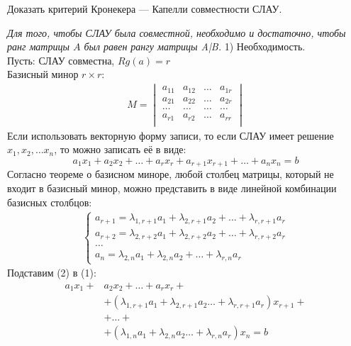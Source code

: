 \begin{question}
  Доказать критерий Кронекера — Капелли совместности СЛАУ.
\end{question} 
\begin{answer}
  \textit{Для того, чтобы СЛАУ была совместной, необходимо и достаточно, чтобы ранг матрицы $A$ был равен рангу матрицы A|B.}
  1) Необходимость. \\
  Пусть: СЛАУ совместна, $Rg(a) = r$\\
  Базисный минор  $r \times r$:
  \begin{gather*}
    M =
    \begin{vmatrix} 
      a_{11} & a_{12} & \ldots & a_{1r} \\ 
      a_{21} & a_{22} & \ldots & a_{2r} \\ 
      \ldots & \ldots & \ldots & \ldots \\
      a_{r1} & a_{r2} & \ldots & a_{rr} \\ 
    \end{vmatrix} 
  \end{gather*}
  Если использовать векторную форму записи, то если СЛАУ имеет решение $x_1, x_2, \ldots x_{n}$, то можно записать её в виде: \[
      a_1x_1 + a_2x_2 + \ldots + a_r x_r + a_{r+1} x_{r+1} + \ldots + a_{n} x_{n} = b \tag{1}
  \]
  Согласно теореме о базисном миноре, любой столбец матрицы, который не входит в базисный минор, можно представить в виде линейной комбинации базисных столбцов:
  \begin{gather*}
    \begin{cases}
      a_{r+1} = \lambda_{1,r+1} a_1 + \lambda_{2,r+1} a_2 + \ldots + \lambda_{r,r+1} a_r \\
      a_{r+2} = \lambda_{2,r+2} a_1 + \lambda_{2,r+2} a_2 + \ldots + \lambda_{r,r+2} a_r \\
      \ldots \\
      a_{n} = \lambda_{2,n} a_1 + \lambda_{2,n} a_2 + \ldots + \lambda_{r,n} a_r
    \end{cases} \tag{2} 
  \end{gather*}
  Подставим (2) в (1):
  \begin{align*}
    a_1 x_1 + &a_2 x_2 + \ldots + a_r x_r + \\
            &+ (\lambda_{1,r+1} a_1 + \lambda_{2,r+1} a_2 \ldots + \lambda_{r,r+1} a_r) x_{r+1} + \\
            &+ \ldots + \\
            &+ (\lambda_{1,n} a_1 + \lambda_{2,n} a_2 \ldots + \lambda_{r,n} a_r) x_{n} = b
  \end{align*}

\end{answer}
